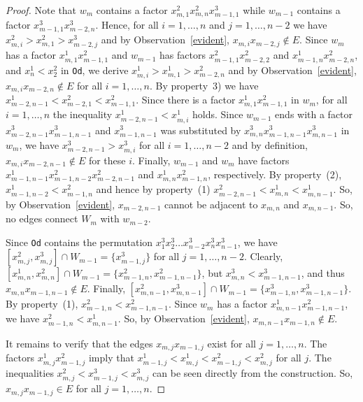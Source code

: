 \documentclass[10pt,a4paper]{amsart}
\begin{document}
\begin{proof}
Note that $w_m$ contains a factor  $x_{m,1}^2x_{m,n}^2x_{m-1,1}^3$ while $w_{m-1}$ contains a factor $x_{m-1,1}^3x_{m-2,n}^3$. Hence,
 for all $i=1,\ldots,n$ and $j=1,\ldots,n-2$ we have $x_{m,i}^2>x_{m,1}^2>x_{m-2,j}^3$ and by Observation~\ref{evident}, $x_{m,i}x_{m-2,j}\not\in E$. 
Since $w_m$ has a factor $x_{m,1}^1x_{m-1,1}^2$ and $w_{m-1}$ has factors  $x_{m-1,1}^2x_{m-2,2}^2$ and $x_{m-1,n}^1x_{m-2,n}^2$, and $x_n^1<x_2^2$ in \texttt{Od}, we derive
$x_{m,i}^1>x_{m,1}^1>x_{m-2,n}^2$ and  by Observation~\ref{evident}, $x_{m,i}x_{m-2,n}\not\in E$ for all $i=1,\ldots,n$. By property~3) we have
$x_{m-2,n-1}^1<x_{m-2,1}^2<x_{m-1,1}^2$. Since there is a factor $x_{m,1}^1x_{m-1,1}^2$ in $w_m$, for all $i=1,\ldots,n$ the inequality $x_{m-2,n-1}^1<x_{m,i}^1$ holds.
Since $w_{m-1}$ ends with a factor $x_{m-2,n-1}^3x_{m-1,n-1}^3$ and $x_{m-1,n-1}^3$ was substituted by $ x_{m,n}^3x_{m-1,n-1}^3x_{m,n-1}^3$ in $w_m$, we have $x_{m-2,n-1}^3>x_{m,i}^3$ for all $i=1,\ldots, n-2$ and  by definition, $x_{m,i}x_{m-2,n-1}\not\in E$ for these $i$. Finally, $w_{m-1}$ and $w_m$ have factors 
$ x_{m-1,n-1}^1x_{m-1,n-2}^2x_{m-2,n-1}^2$ and $x_{m,n}^1x_{m-1,n}^2$, respectively. By property~(2), $x_{m-1,n-2}^1<x_{m-1,n}^2$ and hence by property~(1)
$x_{m-2,n-1}^2<x_{m,n}^1<x_{m,n-1}^1$. So, by Observation~\ref{evident}, $x_{m-2,n-1}$ cannot be adjacent to $x_{m,n}$ and $x_{m,n-1}$. So, no edges connect $W_m$ with $w_{m-2}$.

Since \texttt{Od} contains the permutation $x_1^3x_2^3\ldots x_{n-2}^3x_n^3x_{n-1}^3$, we have $[x_{m,j}^2,x_{m,j}^3]\cap W_{m-1}=\{x_{m-1,j}^3\}$ for all $j=1,\ldots,n-2$. 
Clearly,  $[x_{m,n}^1,x_{m,n}^2]\cap W_{m-1}=\{x_{m-1,n}^2,x_{m-1,n-1}^2\}$, but $x_{m,n}^3<x_{m-1,n-1}^3$, and thus $x_{m,n}x_{m-1,n-1}\not\in E$.
Finally,  $[x_{m,n-1}^2,x_{m,n-1}^3]\cap W_{m-1}=\{x_{m-1,n}^3,x_{m-1,n-1}^3\}$. By property~(1), $x_{m-1,n}^2<x_{m-1,n-1}^2$. Since $w_m$ has a factor
$x_{m,n-1}^1x_{m-1,n-1}^2$, we have $x_{m-1,n}^2<x_{m,n-1}^1$. So,  by Observation~\ref{evident}, $x_{m,n-1}x_{m-1,n}\not\in E$.

It remains to verify that the edges $x_{m,j}x_{m-1,j}$ exist for all $j=1,\ldots,n$. The factors $x_{m,j}^1x_{m-1,j}^2$ imply that 
$x_{m-1,j}^1<x_{m,j}^1<x_{m-1,j}^2<x_{m,j}^2$ for all $j$. The inequalities $x_{m,j}^2<x_{m-1,j}^3<x_{m,j}^3$ can be seen directly from the construction. So, 
 $x_{m,j}x_{m-1,j}\in E$ for all $j=1,\ldots, n$.
\end{proof}
\end{document}
